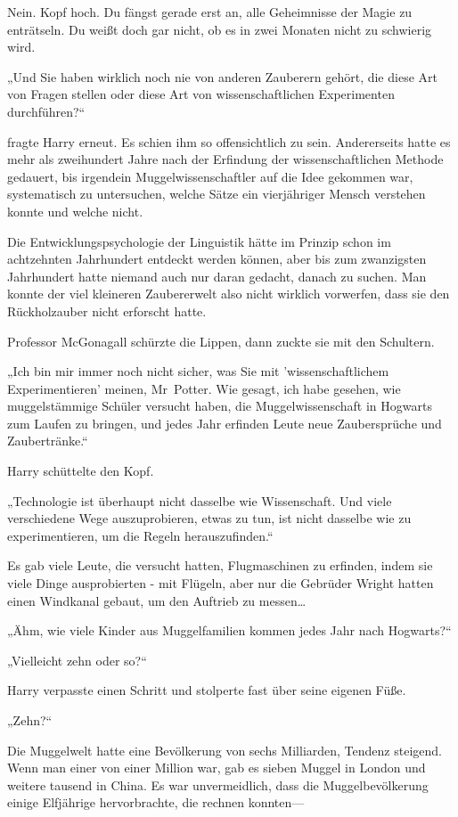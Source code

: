 {Nein. Kopf hoch. Du fängst gerade erst an, alle Geheimnisse der Magie zu enträtseln. Du weißt doch gar nicht, ob es in zwei Monaten nicht zu schwierig wird.

„Und Sie haben wirklich noch nie von anderen Zauberern gehört, die diese Art von Fragen stellen oder diese Art von wissenschaftlichen Experimenten durchführen?“

fragte Harry erneut. Es schien ihm so offensichtlich zu sein. Andererseits hatte es mehr als zweihundert Jahre nach der Erfindung der wissenschaftlichen Methode gedauert, bis irgendein Muggelwissenschaftler auf die Idee gekommen war, systematisch zu untersuchen, welche Sätze ein vierjähriger Mensch verstehen konnte und welche nicht.

Die Entwicklungspsychologie der Linguistik hätte im Prinzip schon im achtzehnten Jahrhundert entdeckt werden können, aber bis zum zwanzigsten Jahrhundert hatte niemand auch nur daran gedacht, danach zu suchen. Man konnte der viel kleineren Zaubererwelt also nicht wirklich vorwerfen, dass sie den Rückholzauber nicht erforscht hatte.

Professor McGonagall schürzte die Lippen, dann zuckte sie mit den Schultern.

„Ich bin mir immer noch nicht sicher, was Sie mit 'wissenschaftlichem Experimentieren' meinen, Mr~Potter. Wie gesagt, ich habe gesehen, wie muggelstämmige Schüler versucht haben, die Muggelwissenschaft in Hogwarts zum Laufen zu bringen, und jedes Jahr erfinden Leute neue Zaubersprüche und Zaubertränke.“

Harry schüttelte den Kopf.

„Technologie ist überhaupt nicht dasselbe wie Wissenschaft. Und viele verschiedene Wege auszuprobieren, etwas zu tun, ist nicht dasselbe wie zu experimentieren, um die Regeln herauszufinden.“

Es gab viele Leute, die versucht hatten, Flugmaschinen zu erfinden, indem sie viele Dinge ausprobierten - mit Flügeln, aber nur die Gebrüder Wright hatten einen Windkanal gebaut, um den Auftrieb zu messen…

„Ähm, wie viele Kinder aus Muggelfamilien kommen jedes Jahr nach Hogwarts?“

„Vielleicht zehn oder so?“

Harry verpasste einen Schritt und stolperte fast über seine eigenen Füße.

„Zehn?“

Die Muggelwelt hatte eine Bevölkerung von sechs Milliarden, Tendenz steigend. Wenn man einer von einer Million war, gab es sieben Muggel in London und weitere tausend in China. Es war unvermeidlich, dass die Muggelbevölkerung einige Elfjährige hervorbrachte, die rechnen konnten—

}
